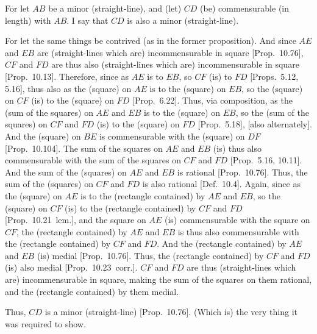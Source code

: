 \begin{Parallel}{}{}
{For let $AB$ be a minor (straight-line), and (let) $CD$ (be) commensurable
(in length) with $AB$. I say that $CD$ is also a minor (straight-line).

\epsfysize=0.7in
\centerline{}

For let the same things be contrived (as in the former proposition).
And since $AE$ and $EB$ are (straight-lines which are) incommensurable in square [Prop.~10.76], $CF$ and $FD$ are thus also
(straight-lines which are)  incommensurable in square [Prop.~10.13].
Therefore, since as $AE$ is to $EB$, so $CF$ (is) to $FD$ [Props.~5.12, 5.16], thus also
as the (square) on $AE$ is to the (square) on $EB$, so the (square)
on $CF$ (is) to the (square) on $FD$ [Prop.~6.22]. Thus, via composition,
as the (sum of the squares) on $AE$ and $EB$ is to the (square) on $EB$,
so the (sum of the squares) on $CF$ and $FD$  (is) to the (square) on $FD$  [Prop.~5.18], [also alternately]. And the
(square) on $BE$ is commensurable with the (square) on $DF$ [Prop.~10.104]. The sum of the squares on $AE$ and $EB$ (is) thus also commensurable with the sum of the squares
on $CF$ and $FD$ [Prop.~5.16, 10.11].  And the sum of the (squares) on
$AE$ and $EB$ is rational [Prop.~10.76].
Thus, the sum of the (squares) on $CF$ and $FD$ is also rational
[Def.~10.4]. Again, since as the (square) on $AE$
is to the (rectangle contained) by $AE$ and $EB$, so
the (square) on $CF$ (is) to the (rectangle contained) by
$CF$ and $FD$ [Prop.~10.21~lem.],
and the square on $AE$ (is) commensurable with the square on
$CF$, the (rectangle contained) by $AE$ and $EB$ is thus also commensurable
with the (rectangle contained) by $CF$ and $FD$. And the
(rectangle contained) by $AE$ and $EB$ (is) medial [Prop.~10.76].  Thus, the (rectangle contained) by
$CF$ and $FD$ (is) also medial [Prop.~10.23~corr.]. $CF$ and $FD$
are thus (straight-lines which are) incommensurable in square, making the sum of the
squares on them rational, and the (rectangle contained) by them
medial.

Thus, $CD$ is a minor (straight-line) [Prop.~10.76]. (Which is) the very thing it
was required to show.}
\end{Parallel}

